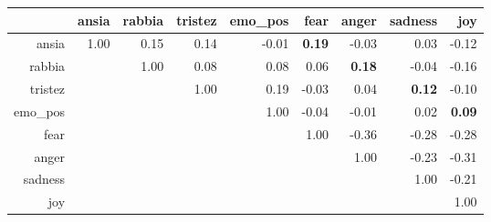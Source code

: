 \documentclass[12pt,a4paper]{standalone}
\begin{document}

\begin{table}[ht]
\centering
\begin{tabular}{rrrrrrrrr}
  \toprule
 & ansia & rabbia & tristez & emo\_pos & fear & anger & sadness & joy \\ 
  \midrule
ansia & 1.00 & 0.15 & 0.14 & -0.01 & \textbf{0.19} & -0.03 & 0.03 & -0.12 \\ 
  rabbia &  & 1.00 & 0.08 & 0.08 & 0.06 & \textbf{0.18} & -0.04 & -0.16 \\ 
  tristez &  &  & 1.00 & 0.19 & -0.03 & 0.04 & \textbf{0.12} & -0.10 \\ 
  emo\_pos &  &  &  & 1.00 & -0.04 & -0.01 & 0.02 & \textbf{0.09} \\ 
  fear &  &  &  &  & 1.00 & -0.36 & -0.28 & -0.28 \\ 
  anger &  &  &  &  &  & 1.00 & -0.23 & -0.31 \\ 
  sadness &  &  &  &  &  &  & 1.00 & -0.21 \\ 
  joy &  &  &  &  &  &  &  & 1.00 \\ 
   \bottomrule
\end{tabular}
\end{table}

\endminipage
\end{document}
